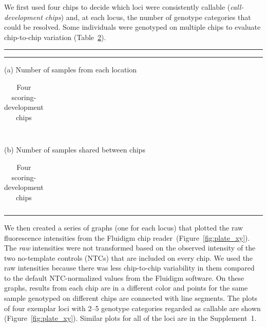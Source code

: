 \documentclass[twocolumn,natbib]{svjour3}       %
\begin{document}
We first used four chips to decide which loci were consistently callable 
({\em call-development chips}) and, at each locus, the number of genotype categories that
could be resolved. Some individuals were genotyped on multiple chips to evaluate chip-to-chip variation (Table~\ref{tab:devo-samps}). 
\begin{table}
\hrule \kern 0.5mm \hrule
\small
\caption{Four scoring-development chips}
\label{tab:devo-samps}
(a) Number of samples from each location
\begin{center}
\begin{tabular}{lrrr}

\hline
\end{tabular}
\end{center}
\mbox{}\\
(b) Number of samples shared between chips
\begin{center}
\begin{tabular}{lrrrr}

\hline
\end{tabular}
\end{center}
\hrule
\end{table}
We then created a
series of graphs (one for each locus) that plotted the raw fluorescence
intensities from the Fluidigm chip reader~(Figure~\ref{fig:plate_xy}). The {\em raw} intensities
were not transformed based on the
observed intensity of the two no-template controls (NTCs) that are included on every chip.
We used the raw intensities because there was less chip-to-chip
variability in them
compared to the default NTC-normalized values from the Fluidigm software. On these 
graphs, results from each
chip are in a different color and points for the same sample genotyped on
different chips are connected with line segments. The plots of four exemplar loci
with 2--5 genotype categories regarded as callable are
shown (Figure~\ref{fig:plate_xy}). 
Similar plots for all of the loci are in the Supplement~1.
\end{document}
